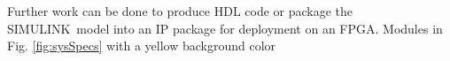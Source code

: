\par Further work can be done to produce HDL code or package the SIMULINK\textregisteredmark\ model into an IP package for deployment on an FPGA. Modules in Fig. \ref{fig:sysSpecs} with a yellow background color 